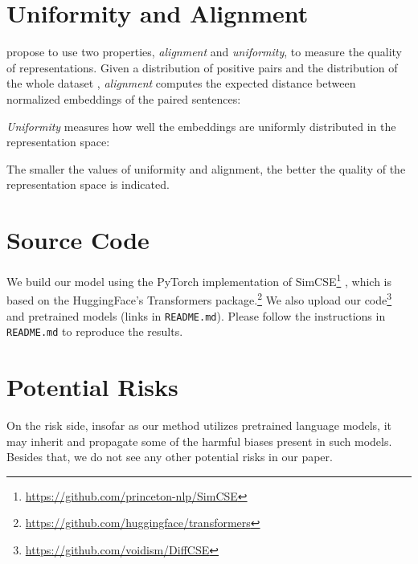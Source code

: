 \documentclass[11pt]{article}
\begin{document}
\section{Uniformity and Alignment}
\label{sec:uni_align}

\citet{wang2020understanding} propose to use two properties, \emph{alignment} and \emph{uniformity}, to measure the quality of representations.
Given a distribution of positive pairs  and the distribution of the whole dataset , \emph{alignment} computes the expected distance between normalized embeddings of the paired sentences:

\emph{Uniformity} measures how well the embeddings are uniformly distributed in the representation space:

The smaller the values of uniformity and alignment, the better the quality of the representation space is indicated.
\section{Source Code}
\label{sec:code}

We build our model using the PyTorch implementation of SimCSE\footnote{\url{https://github.com/princeton-nlp/SimCSE}} \citet{gao2021simcse}, which is based on the HuggingFace's Transformers package.\footnote{\url{https://github.com/huggingface/transformers}} We also upload our code\footnote{\url{https://github.com/voidism/DiffCSE}} and pretrained models (links in \texttt{README.md}). Please follow the instructions in \texttt{README.md} to reproduce the results.

\section{Potential Risks}
\label{sec:risk}

On the risk side, insofar as our method utilizes pretrained language models, it may inherit and propagate some of the harmful biases present in such models. Besides that, we do not see any other potential risks in our paper.
\end{document}
